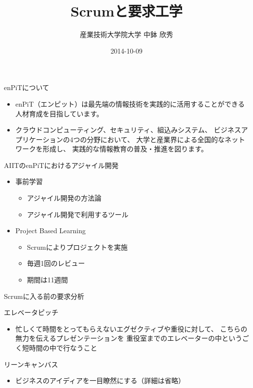 \documentclass[t]{beamer}
\author{産業技術大学院大学 \linebreak 中鉢 欣秀}
\date{2014-10-09}
\title{Scrumと要求工学}
\begin{document}
\maketitle


\begin{frame}[label=sec-1]{enPiTについて}
\begin{itemize}
\item enPiT（エンピット）は最先端の情報技術を実践的に活用することができる
人材育成を目指しています。
\item クラウドコンピューティング、セキュリティ、組込みシステム、
ビジネスアプリケーションの4つの分野において、
大学と産業界による全国的なネットワークを形成し、
実践的な情報教育の普及・推進を図ります。
\end{itemize}
\end{frame}

\begin{frame}[label=sec-2]{AIITのenPiTにおけるアジャイル開発}
\begin{itemize}
\item 事前学習
\begin{itemize}
\item アジャイル開発の方法論
\item アジャイル開発で利用するツール
\end{itemize}
\item Project Based Learning
\begin{itemize}
\item Scrumによりプロジェクトを実施
\item 毎週1回のレビュー
\item 期間は11週間
\end{itemize}
\end{itemize}
\end{frame}

\begin{frame}[label=sec-3]{Scrumに入る前の要求分析}
\begin{block}{エレベータピッチ}
\begin{itemize}
\item 忙しくて時間をとってもらえないエグゼクティブや重役に対して、
こちらの無力を伝えるプレゼンテーションを
重役室までのエレベーターの中というごく短時間の中で行なうこと
\end{itemize}
\end{block}
\begin{block}{リーンキャンバス}
\begin{itemize}
\item ビジネスのアイディアを一目瞭然にする（詳細は省略）
\end{itemize}
\end{block}
\end{frame}
\end{document}
